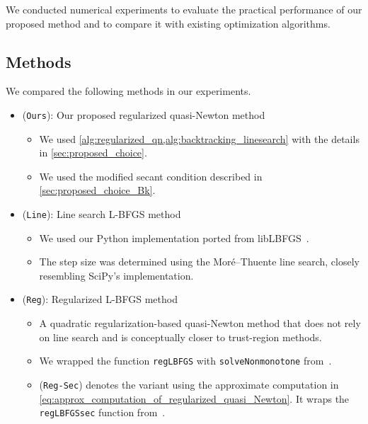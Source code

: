 \documentclass[journal_revised_MPC]{subfiles}
\begin{document}
We conducted numerical experiments to evaluate the practical performance of our proposed method and to compare it with existing optimization algorithms.

\subsection{Methods}\label{sssec:methods}

We compared the following methods in our experiments.

\begin{itemize}
    \item (\texttt{Ours}): Our proposed regularized quasi-Newton method
          \begin{itemize}
              \item We used \cref{alg:regularized_qn,alg:backtracking_linesearch} with the details in \cref{sec:proposed_choice}.
              \item We used the modified secant condition described in \cref{sec:proposed_choice_Bk}.
          \end{itemize}

    \item (\texttt{Line}): Line search L-BFGS method
          \begin{itemize}
              \item We used our Python implementation ported from libLBFGS~\citep{Okazaki2007libLBFGS}.
              \item The step size was determined using the Mor\'e--Thuente line search, closely resembling SciPy's implementation.
          \end{itemize}

    \item (\texttt{Reg}): Regularized L-BFGS method~\citep{kanzowRegularizationLimitedMemory2023}
          \begin{itemize}
              \item A quadratic regularization-based quasi-Newton method that does not rely on line search and is conceptually closer to trust-region methods.
              \item We wrapped the function \texttt{regLBFGS} with \texttt{solveNonmonotone} from~\citep{kanzowRegularizationLimitedMemory2023}.
              \item (\texttt{Reg-Sec}) denotes the variant using the approximate computation in \cref{eq:approx_computation_of_regularized_quasi_Newton}.
              It wraps the \texttt{regLBFGSsec} function from~\citep{kanzowRegularizationLimitedMemory2023}.
          \end{itemize}


\end{itemize}
\end{document}
